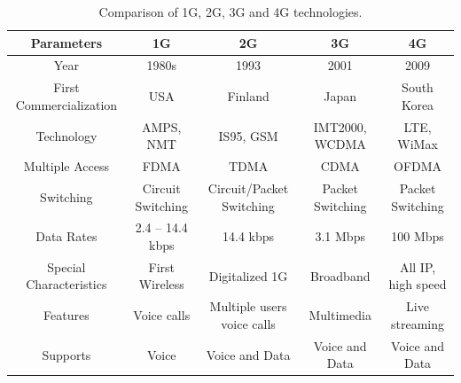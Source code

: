 \setcounter{table}{0}
\begin{table}[ht]
\begin{center}
{\fontsize{8pt}{10pt}\selectfont
\caption{Comparison of 1G, 2G, 3G and 4G technologies.} \label{Tab_AllG}
\smallskip
\tabcolsep=4pt
\renewcommand{\arraystretch}{1.17}
\begin{tabular}{|c|c|c|c|c|}
\hline
\textbf{Parameters}              & \textbf{1G}                & \textbf{2G}                                 & \textbf{3G}                                   & \textbf{4G}                                                   \\ \hline
Year                    & 1980s             & 1993                               & 2001                                 & 2009                                                 \\ \hline
First Commercialization & USA               & Finland                            & Japan                                & South Korea                                          \\ \hline
Technology              & AMPS, NMT   & IS95, GSM                          & IMT2000, WCDMA                       & LTE, WiMax                                           \\ \hline
Multiple Access         & FDMA              & TDMA                               & CDMA                                 & OFDMA                                                \\ \hline
Switching               & Circuit Switching & Circuit/Packet Switching           & Packet Switching                     & Packet Switching                                     \\ \hline
Data Rates              & 2.4 -- 14.4 kbps  & 14.4 kbps                          & 3.1 Mbps                             & 100 Mbps                                             \\ \hline
Special Characteristics & First Wireless    & Digitalized 1G                     & Broadband                            & All IP, high speed                                   \\ \hline
Features                & Voice calls       & Multiple users voice calls         & Multimedia                           & Live streaming                                       \\ \hline
Supports                & Voice             & Voice and Data                     & Voice and Data                       & Voice and Data                                       \\ \hline

\end{tabular}}
\end{center}
\end{table}
